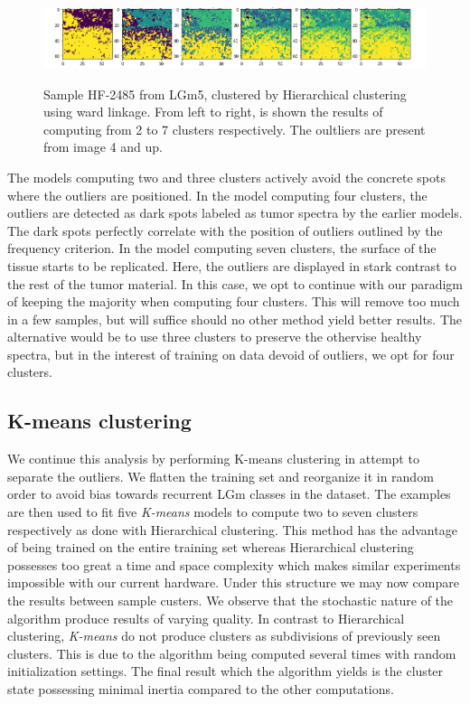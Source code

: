 \begin{figure}[h]

    \centering
{\includegraphics[width=15cm]{images/Ward_linkage/LGm-5/HF-2485_V1B_1.h5_9.png} }
\caption{Sample HF-2485 from LGm5, clustered by Hierarchical clustering using ward linkage. From left to right, is shown the results of computing from 2 to 7 clusters respectively. The oultliers are present from image 4 and up.
\label{fig:hf_2485}}%
\end{figure}

The models computing two and three clusters actively avoid the concrete spots where the outliers are positioned. In the model computing four clusters, the outliers are detected as dark spots labeled as tumor spectra by the earlier models. The dark spots perfectly correlate with the position of outliers outlined by the frequency criterion. In the model computing seven clusters, the surface of the tissue starts to be replicated. Here, the outliers are displayed in stark contrast to the rest of the tumor material. In this case, we opt to continue with our paradigm of keeping the majority when computing four clusters. This will remove too much in a few samples, but will suffice should no other method yield better results. The alternative would be to use three clusters to preserve the othervise healthy spectra, but in the interest of training on data devoid of outliers, we opt for four clusters.

\subsection{K-means clustering}

We continue this analysis by performing K-means clustering in attempt to separate the outliers. We flatten the training set and reorganize it in random order to avoid bias towards recurrent LGm classes in the dataset. The examples are then used to fit five \textit{K-means} models to compute two to seven clusters respectively as done with Hierarchical clustering. This method has the advantage of being trained on the entire training set whereas Hierarchical clustering possesses too great a time and space complexity which makes similar experiments impossible with our current hardware. Under this structure we may now compare the results between sample custers. We observe that the stochastic nature of the algorithm produce results of varying quality. In contrast to Hierarchical clustering, \textit{K-means} do not produce clusters as subdivisions of previously seen clusters. This is due to the algorithm being computed several times with random initialization settings. The final result which the algorithm yields is the cluster state possessing minimal inertia compared to the other computations.

